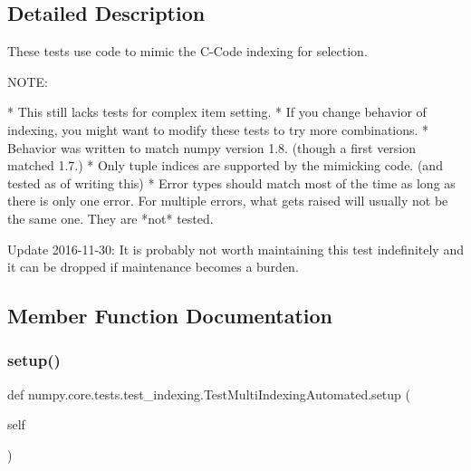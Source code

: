 \subsection{Detailed Description}
\begin{DoxyVerb}These tests use code to mimic the C-Code indexing for selection.

NOTE:

    * This still lacks tests for complex item setting.
    * If you change behavior of indexing, you might want to modify
      these tests to try more combinations.
    * Behavior was written to match numpy version 1.8. (though a
      first version matched 1.7.)
    * Only tuple indices are supported by the mimicking code.
      (and tested as of writing this)
    * Error types should match most of the time as long as there
      is only one error. For multiple errors, what gets raised
      will usually not be the same one. They are *not* tested.

Update 2016-11-30: It is probably not worth maintaining this test
indefinitely and it can be dropped if maintenance becomes a burden.\end{DoxyVerb}
 

\subsection{Member Function Documentation}
\mbox{\label{classnumpy_1_1core_1_1tests_1_1test__indexing_1_1TestMultiIndexingAutomated_a8c5f355096c9aae6f677db5f7dc8bc92}} 
\subsubsection{\texorpdfstring{setup()}{setup()}}
{\footnotesize\ttfamily def numpy.\+core.\+tests.\+test\+\_\+indexing.\+Test\+Multi\+Indexing\+Automated.\+setup (\begin{DoxyParamCaption}\item[{}]{self }\end{DoxyParamCaption})}


